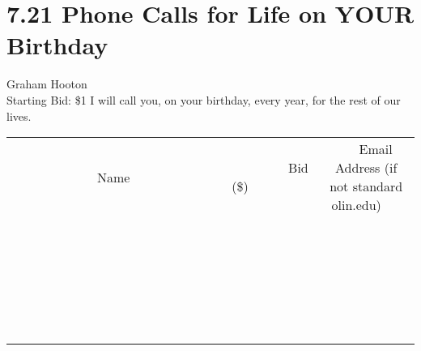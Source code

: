 \documentclass[11pt]{article}
\begin{document}
\section*{7.21 Phone Calls for Life on YOUR Birthday}
Graham Hooton
\\
Starting Bid: \$1
\newline
I will call you, on your birthday, every year, for the rest of our lives.
\\[6ex]
\begin{tabular}{c c c}
~~~~~~~~~~~~~Name~~~~~~~~~~~~~ & ~~~~~~~~~Bid (\$)~~~~~~~~~  & ~~~Email Address (if not standard olin.edu)~~~\\
 & & \\
\hline
 & & \\
\hline
 & & \\
\hline
 & & \\
\hline
 & & \\
\hline
 & & \\
\hline
 & & \\
\hline
 & & \\
\hline
 & & \\
\hline
 & & \\
\hline
 & & \\
\hline
 & & \\
\hline
 & & \\
\hline
 & & \\
\hline
 & & \\
\hline
 & & \\
\hline
 & & \\
\hline
 & & \\
\hline
 & & \\
\hline
 & & \\
\hline
 & & \\
\hline
 & & \\
\hline
 & & \\
\hline
 & & \\
\hline
 & & \\
\hline
 & & \\
\hline
\end{tabular}
\newpage
\end{document}
